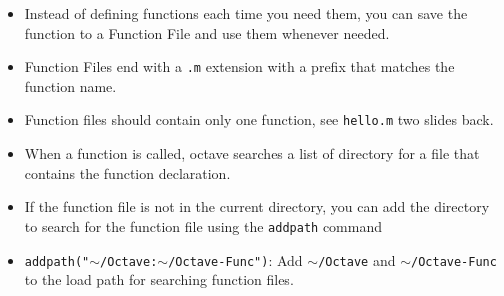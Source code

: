 \documentclass[t,compress,xcolor=svgnames]{beamer}
\begin{document}
\begin{frame}
\begin{itemize}
{\begin{columns}
\begin{verbatim}
function average = avg (a)
  average = sum(a)/length(a) ;
endfunction

function [max,id] = vmax(a)
  id = 1;
  max = a(id);
  for i = 2:length(a)
    if ( a(i) > max )
      max = a(i) ;
      id = i ;
    endif
  endfor
endfunction
       \end{verbatim}
       \column{6cm}
       \begin{verbatim}
b = rand(20,1);
[max,id] = vmax(b); 
printf ( "Average of vector v = %f\n", avg(v)) 
printf ( "Maximum value of vector b = %f with \
   id = %d\n",max,id )


[apacheco@tezpur1 octave] ./func.sh 
Average of vector v = 0.512198
Maximum value of vector b = 0.996040 with id = 7
       \end{verbatim}
     \end{columns}
   }
   \item Instead of defining functions each time you need them, you can save the function to a Function File and use them whenever needed.
   \item Function Files end with a \texttt{.m} extension with a prefix that matches the function name.
   \item Function files should contain only one function, see \texttt{hello.m} two slides back.
   \item When a function is called, octave searches a list of directory for a file that contains the function declaration.
   \item If the function file is not in the current directory, you can add the directory to search for the function file using the \texttt{addpath} command
   \item[] \texttt{addpath("$\sim$/Octave:$\sim$/Octave-Func")}: Add \texttt{$\sim$/Octave} and \texttt{$\sim$/Octave-Func} to the load path for searching function files.
  \end{itemize}
\end{frame}
\end{document}
